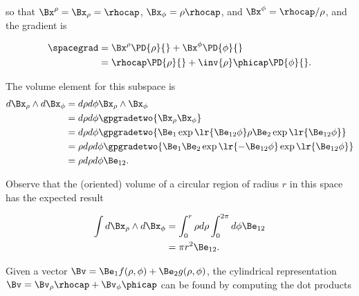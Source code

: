 so that \( \Bx^\rho = \Bx_\rho = \rhocap \), \( \Bx_\phi = \rho \rhocap \), and \( \Bx^\phi = \rhocap/\rho \), and the gradient is

\begin{equation}\label{eqn:2Dcylindrical:600}
\begin{aligned}
\spacegrad
&= \Bx^\rho \PD{\rho}{} + \Bx^\phi \PD{\phi}{} \\
&= \rhocap \PD{\rho}{} +\inv{\rho} \phicap \PD{\phi}{}.
\end{aligned}
\end{equation}

The volume element for this subspace is
\begin{equation}\label{eqn:2Dcylindrical:220}
\begin{aligned}
d\Bx_\rho \wedge d\Bx_\phi
&= d\rho d\phi \Bx_\rho \wedge \Bx_\phi \\
&= d\rho d\phi \gpgradetwo{ \Bx_\rho \Bx_\phi } \\
&= d\rho d\phi \gpgradetwo{ \Be_1 \exp\lr{ \Be_{12} \phi } \rho \Be_2 \exp\lr{ \Be_{12} \phi } } \\
&= \rho d\rho d\phi \gpgradetwo{ \Be_1 \Be_2 \exp\lr{ -\Be_{12} \phi } \exp\lr{ \Be_{12} \phi } } \\
&= \rho d\rho d\phi \Be_{12}.
\end{aligned}
\end{equation}

Observe that the (oriented) volume of a circular region of radius \( r \) in this space has the expected result

\begin{equation}\label{eqn:2Dcylindrical:360}
\begin{aligned}
\int d\Bx_\rho \wedge d\Bx_\phi
&= \int_0^r \rho d\rho \int_0^{2\pi} d\phi \Be_{12} \\
&= \pi r^2 \Be_{12}.
\end{aligned}
\end{equation}

Given a vector \( \Bv = \Be_1 f(\rho, \phi) + \Be_2 g(\rho, \phi) \), the cylindrical representation \( \Bv = \Bv_\rho \rhocap + \Bv_\phi \phicap \) can be found by computing the dot products

